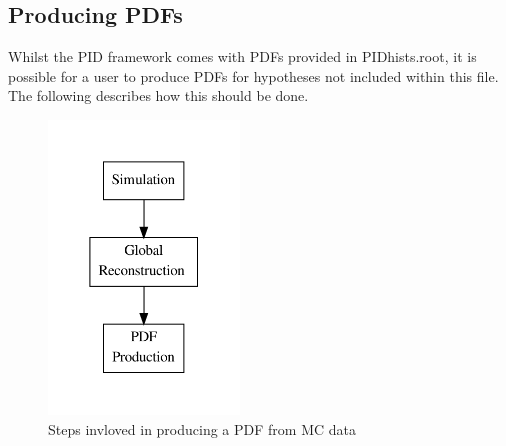 \subsection{Producing PDFs}
\label{PDFs}
Whilst the PID framework comes with PDFs provided in PIDhists.root, it is possible for a user to produce PDFs for hypotheses not included within this file. The following describes how this should be done.
\begin{figure}[h!]
\begin{center} 
\includegraphics[width=2in]{reconstruction/globalpid/pdfprodflow.pdf} 
\caption{Steps invloved in producing a PDF from MC data}
\label{pdfprod}
\end{center} 
\end{figure}
